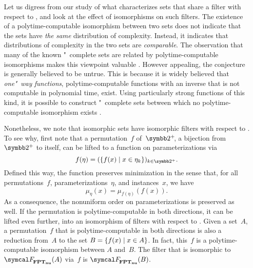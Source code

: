 \medbreak
Let us digress from our study of what characterizes sets that share a filter with respect to , and look at the effect of isomorphisms on such filters.
The existence of a polytime-computable isomorphism between two sets does not indicate that the sets have \emph{the same} distribution of complexity.
Instead, it indicates that distributions of complexity in the two sets are \emph{comparable}.
The observation that many of the known "~complete sets are related by polytime-computable isomorphisms makes this viewpoint valuable \parencite{berman1977isomorphisms,goldsmith1996scalability}.
However appealing, the conjecture is generally believed to be untrue.
This is because it is widely believed that \emph{one"~way functions}, polytime-computable functions with an inverse that is not computable in polynomial time, exist.
Using particularly strong functions of this kind, it is possible to construct "~complete sets between which no polytime-computable isomorphism exists \parencite{young1983some,kurtz1989isomorphism,hartmanis1991one,agrawal2009one}.

Nonetheless, we note that isomorphic sets have isomorphic filters with respect to .
To see why, first note that a permutation~$f$ of~$\binary^+\!$, a bijection from $\binary^+$ to itself, can be lifted to a function on parameterizations via
\begin{equation*}
  f(\eta) = (\{f(x) \st x \in \eta_k\})_{k \in \binary^+}.
\end{equation*}
Defined this way, the function preserves minimization in the sense that, for all permutations~$f$, parameterizations~$\eta$, and instances~$x$, we have
\begin{equation*}
  \mu_\eta(x) = \mu_{f(\eta)}(f(x)).
\end{equation*}
As a consequence, the nonuniform order on parameterizations is preserved as well.
If the permutation is polytime-computable in both directions, it can be lifted even further, into an isomorphism of filters with respect to .
Given a set~$A$, a permutation~$f$ that is polytime-computable in both directions is also a reduction from~$A$ to the set $B = \{f(x) \;|\; x \in A\}$.
In fact, this~$f$ is a polytime-computable isomorphism between $A$ and~$B$.
The filter that is isomorphic to $\calF_\clnu{FPT}(A)$ via~$f$ is $\calF_\clnu{FPT}(B)$.

